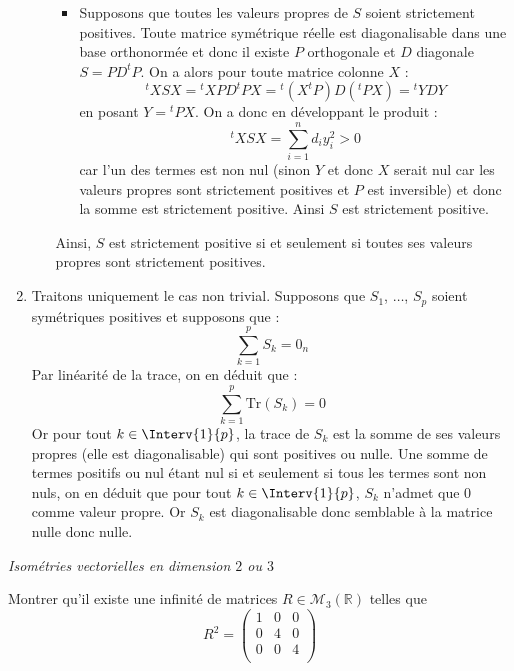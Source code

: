 \documentclass[a4paper,10pt]{report}
\begin{document}
\begin{enumerate}
\begin{enumerate}
\begin{itemize}
\item Supposons que toutes les valeurs propres de $S$ soient strictement positives. Toute matrice sym\'etrique r\'eelle est diagonalisable dans une base orthonorm\'ee et donc il existe $P$ orthogonale et $D$ diagonale $S=PD^{t}P$. On a alors pour toute matrice colonne $X$ :
$$^{t}XSX={}^{t}XPD^{t}PX={}^{t}\left( X^{t}P\right) D(^{t}PX)={}^{t}YDY$$
en posant $Y={}^{t}PX$. On a donc en développant le produit :
$$^{t}XSX= \sum_{i=1}^{n}d_{i}y_{i}^{2} > 0$$
car l'un des termes est non nul (sinon $Y$ et donc $X$ serait nul car les valeurs propres sont strictement positives et $P$ est inversible) et donc la somme est strictement positive. Ainsi $S$ est strictement positive.
\end{itemize}
Ainsi, $S$ est strictement positive si et seulement si toutes ses valeurs propres sont strictement positives.
\end{enumerate}
\item Traitons uniquement le cas non trivial. Supposons que $S_1$, $\ldots$, $S_p$ soient symétriques positives et supposons que :
$$\sum_{k=1}^p S_k = 0_n$$
Par linéarité de la trace, on en déduit que :
$$ \sum_{k=1}^p \textrm{Tr}(S_k) = 0$$
Or pour tout $k \in \Interv{1}{p}$, la trace de $S_k$ est la somme de ses valeurs propres (elle est diagonalisable) qui sont positives ou nulle. Une somme de termes positifs ou nul étant nul si et seulement si tous les termes sont non nuls, on en déduit que pour tout $k \in \Interv{1}{p}$, $S_k$ n'admet que $0$ comme valeur propre. Or $S_k$ est diagonalisable donc semblable à la matrice nulle donc nulle.
\end{enumerate}

\medskip

\begin{center}
\textit{{ {\large Isométries vectorielles en dimension $2$ ou $3$}}}
\end{center}

\medskip

\begin{Exercice}{} Montrer qu'il existe une infinité de matrices $R \in \mathcal{M}_3(\mathbb{R})$ telles que
$$  R^2 = \begin{pmatrix}
1 & 0 & 0 \\
0 & 4 & 0 \\
0 & 0 & 4 \\
\end{pmatrix}$$
\end{Exercice}
\end{document}
